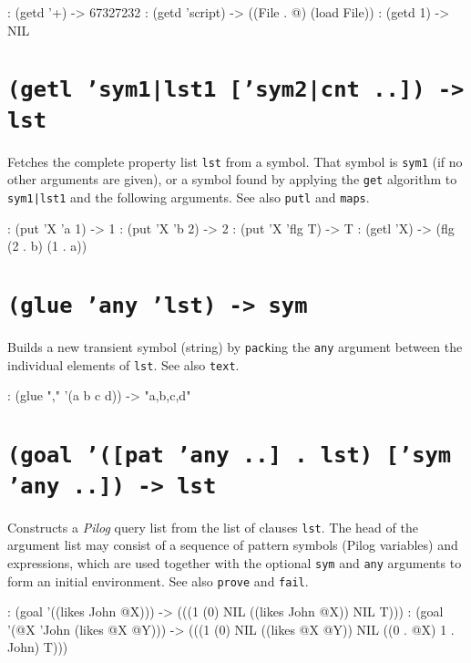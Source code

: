 \begin{wideverbatim}
: (getd '+)
-> 67327232
: (getd 'script)
-> ((File . @) (load File))
: (getd 1)
-> NIL
\end{wideverbatim}

 
\section*{\texttt{(getl 'sym1|lst1 ['sym2|cnt ..]) -> lst}}
\label{sec:func-ref-G-(getl 'sym1|lst1 ['sym2|cnt ..]) -> lst}


Fetches the complete property list \texttt{lst} from a symbol. That symbol is
\texttt{sym1} (if no other arguments are given), or a symbol found by applying
the \texttt{get} algorithm to \texttt{sym1|lst1} and the following arguments. See also
\texttt{putl} and \texttt{maps}.


\begin{wideverbatim}
: (put 'X 'a 1)
-> 1
: (put 'X 'b 2)
-> 2
: (put 'X 'flg T)
-> T
: (getl 'X)
-> (flg (2 . b) (1 . a))
\end{wideverbatim}

 
\section*{\texttt{(glue 'any 'lst) -> sym}}
\label{sec:func-ref-G-(glue 'any 'lst) -> sym}


Builds a new transient symbol (string) by \texttt{pack}ing the
\texttt{any} argument between the individual elements of \texttt{lst}.
See also \texttt{text}.


\begin{wideverbatim}
: (glue "," '(a b c d))
-> "a,b,c,d"
\end{wideverbatim}

 
\section*{\texttt{(goal '([pat 'any ..] . lst) ['sym 'any ..]) -> lst}}
\label{sec:func-ref-G-(goal '([pat 'any ..] . lst) ['sym 'any ..]) -> lst}


Constructs a \emph{Pilog} query list from the list of
clauses \texttt{lst}. The head of the argument list may consist of a sequence
of pattern symbols (Pilog variables) and expressions, which are used
together with the optional \texttt{sym} and \texttt{any} arguments to form an initial
environment. See also \texttt{prove} and \texttt{fail}.


\begin{wideverbatim}
: (goal '((likes John @X)))
-> (((1 (0) NIL ((likes John @X)) NIL T)))
: (goal '(@X 'John (likes @X @Y)))
-> (((1 (0) NIL ((likes @X @Y)) NIL ((0 . @X) 1 . John) T)))
\end{wideverbatim}

